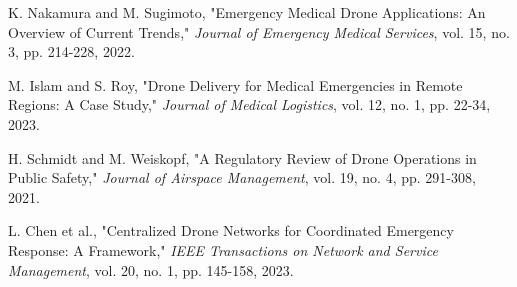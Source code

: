\documentclass[conference]{IEEEtran}
\begin{document}
\begin{thebibliography}{99}
 K. Nakamura and M. Sugimoto, "Emergency Medical Drone Applications: An Overview of Current Trends," \textit{Journal of Emergency Medical Services}, vol. 15, no. 3, pp. 214-228, 2022.

 M. Islam and S. Roy, "Drone Delivery for Medical Emergencies in Remote Regions: A Case Study," \textit{Journal of Medical Logistics}, vol. 12, no. 1, pp. 22-34, 2023.

 H. Schmidt and M. Weiskopf, "A Regulatory Review of Drone Operations in Public Safety," \textit{Journal of Airspace Management}, vol. 19, no. 4, pp. 291-308, 2021.

 L. Chen et al., "Centralized Drone Networks for Coordinated Emergency Response: A Framework," \textit{IEEE Transactions on Network and Service Management}, vol. 20, no. 1, pp. 145-158, 2023.


\end{thebibliography}
\end{document}
